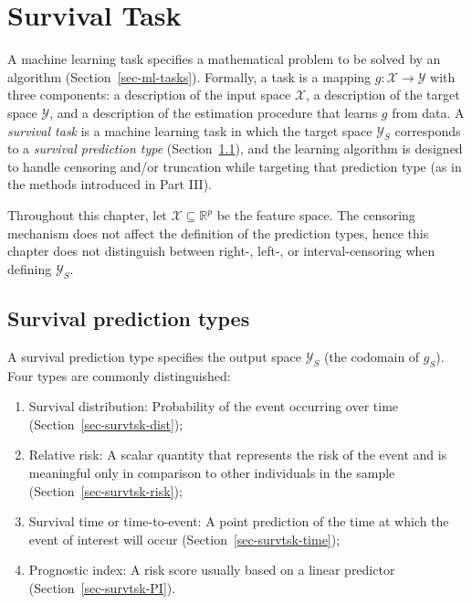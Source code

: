 \documentclass[
  letterpaper,
  krantz2]{style/krantz}
\providecommand{\tightlist}{%
  \setlength{\itemsep}{0pt}\setlength{\parskip}{0pt}}
\begin{document}
\chapter{Survival Task}\label{sec-survtsk}

A machine learning task specifies a
mathematical problem to be solved by an algorithm
(Section~\ref{sec-ml-tasks}). Formally, a task is a mapping
\(g: \mathcal{X}\rightarrow \mathcal{Y}\) with three components: a
description of the input space \(\mathcal{X}\), a description of the
target space \(\mathcal{Y}\), and a description of the estimation
procedure that learns \(g\) from data. A \emph{survival
task} is a machine learning task
in which the target space \(\mathcal{Y}_S\) corresponds to a
\emph{survival prediction type}
(Section~\ref{sec-surv-tsk-predicts}), and the learning algorithm is
designed to handle censoring and/or truncation while targeting that
prediction type (as in the methods introduced in Part III).

Throughout this chapter, let \(\mathcal{X}\subseteq \mathbb{R}^p\) be
the feature space. The censoring mechanism does not affect the
definition of the prediction types, hence this chapter does not
distinguish between right-, left-, or interval-censoring when defining
\(\mathcal{Y}_S\).

\section{Survival prediction types}\label{sec-surv-tsk-predicts}

A survival prediction type specifies the output space \(\mathcal{Y}_S\)
(the codomain of \(g_S\)). Four types are commonly distinguished:

\begin{enumerate}
\def\labelenumi{\arabic{enumi}.}
\tightlist
\item
  Survival distribution: Probability of the
  event occurring over time (Section~\ref{sec-survtsk-dist});
\item
  Relative risk: A scalar quantity that represents
  the risk of the event and is meaningful only in comparison to other
  individuals in the sample (Section~\ref{sec-survtsk-risk});
\item
  Survival time or time-to-event: A point
  prediction of the time at which the event of interest will occur
  (Section~\ref{sec-survtsk-time});
\item
  Prognostic index: A risk score usually based
  on a linear predictor
  (Section~\ref{sec-survtsk-PI}).
\end{enumerate}
\end{document}
